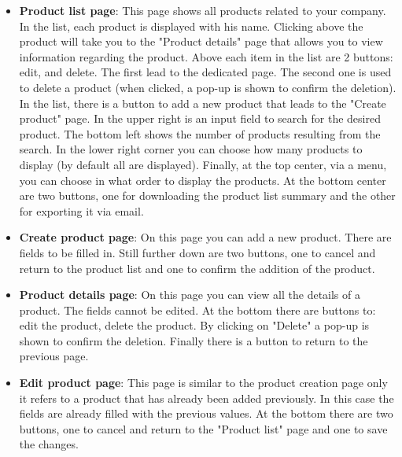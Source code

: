 \begin{itemize}
    \item \textbf{Product list page}: This page shows all products related to your company.
In the list, each product is displayed with his name. Clicking above the product will take you to the "Product details" page that allows you to view information regarding the product. Above each item in the list are 2 buttons: edit, and delete. The first lead to the dedicated page. The second one is used to delete a product (when clicked, a pop-up is shown to confirm the deletion). In the list, there is a button to add a new product that leads to the "Create product" page.
In the upper right is an input field to search for the desired product.
The bottom left shows the number of products resulting from the search. In the lower right corner you can choose how many products to display (by default all are displayed). Finally, at the top center, via a menu, you can choose in what order to display the products.
At the bottom center are two buttons, one for downloading the product list summary and the other for exporting it via email.
    \item \textbf{Create product page}: On this page you can add a new product. There are fields to be filled in. Still further down are two buttons, one to cancel and return to the product list and one to confirm the addition of the product.
    \item \textbf{Product details page}: On this page you can view all the details of a product. The fields cannot be edited. At the bottom there are buttons to: edit the product, delete the product. By clicking on "Delete" a pop-up is shown to confirm the deletion. Finally there is a button to return to the previous page.
    \item \textbf{Edit product page}: This page is similar to the product creation page only it refers to a product that has already been added previously. In this case the fields are already filled with the previous values. At the bottom there are two buttons, one to cancel and return to the "Product list" page and one to save the changes.
\end{itemize}
\newpage
